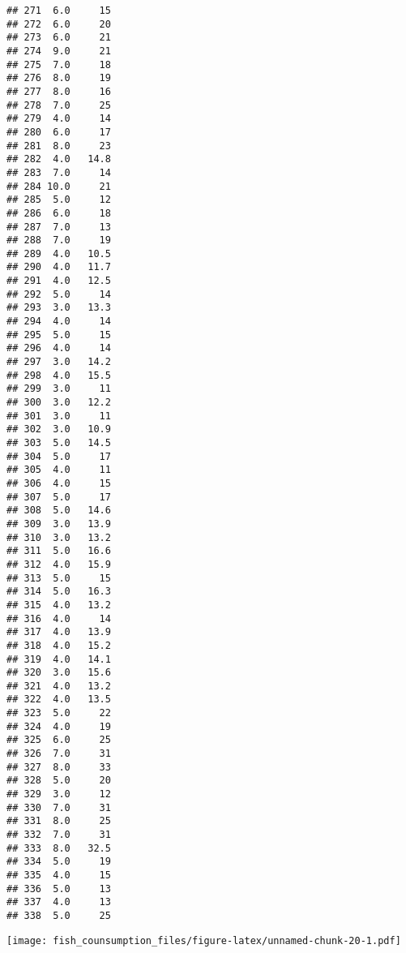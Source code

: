 \documentclass[
]{article}
\newenvironment{Shaded}{\begin{snugshade}}{\end{snugshade}}
\newcommand{\AttributeTok}[1]{\textcolor[rgb]{0.77,0.63,0.00}{#1}}
\newcommand{\CommentTok}[1]{\textcolor[rgb]{0.56,0.35,0.01}{\textit{#1}}}
\newcommand{\FunctionTok}[1]{\textcolor[rgb]{0.00,0.00,0.00}{#1}}
\newcommand{\NormalTok}[1]{#1}
\newcommand{\OtherTok}[1]{\textcolor[rgb]{0.56,0.35,0.01}{#1}}
\newcommand{\SpecialCharTok}[1]{\textcolor[rgb]{0.00,0.00,0.00}{#1}}
\newcommand{\StringTok}[1]{\textcolor[rgb]{0.31,0.60,0.02}{#1}}
\begin{document}
\begin{verbatim}
## 271  6.0     15
## 272  6.0     20
## 273  6.0     21
## 274  9.0     21
## 275  7.0     18
## 276  8.0     19
## 277  8.0     16
## 278  7.0     25
## 279  4.0     14
## 280  6.0     17
## 281  8.0     23
## 282  4.0   14.8
## 283  7.0     14
## 284 10.0     21
## 285  5.0     12
## 286  6.0     18
## 287  7.0     13
## 288  7.0     19
## 289  4.0   10.5
## 290  4.0   11.7
## 291  4.0   12.5
## 292  5.0     14
## 293  3.0   13.3
## 294  4.0     14
## 295  5.0     15
## 296  4.0     14
## 297  3.0   14.2
## 298  4.0   15.5
## 299  3.0     11
## 300  3.0   12.2
## 301  3.0     11
## 302  3.0   10.9
## 303  5.0   14.5
## 304  5.0     17
## 305  4.0     11
## 306  4.0     15
## 307  5.0     17
## 308  5.0   14.6
## 309  3.0   13.9
## 310  3.0   13.2
## 311  5.0   16.6
## 312  4.0   15.9
## 313  5.0     15
## 314  5.0   16.3
## 315  4.0   13.2
## 316  4.0     14
## 317  4.0   13.9
## 318  4.0   15.2
## 319  4.0   14.1
## 320  3.0   15.6
## 321  4.0   13.2
## 322  4.0   13.5
## 323  5.0     22
## 324  4.0     19
## 325  6.0     25
## 326  7.0     31
## 327  8.0     33
## 328  5.0     20
## 329  3.0     12
## 330  7.0     31
## 331  8.0     25
## 332  7.0     31
## 333  8.0   32.5
## 334  5.0     19
## 335  4.0     15
## 336  5.0     13
## 337  4.0     13
## 338  5.0     25
\end{verbatim}

\begin{Shaded}
\end{Shaded}

\texttt{[image: fish\_counsumption\_files/figure-latex/unnamed-chunk-20-1.pdf]}
\end{document}

